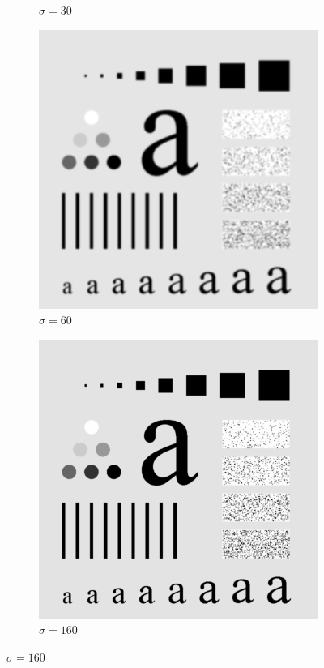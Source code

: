\documentclass[
	12pt, %
]{style/fphw}
\begin{document}
\begin{figure}[H]
\begin{subfigure}[b]{.3\textwidth}
         \caption{$\sigma=30$}
         \label{Q5_2_lowpass_30}
     \end{subfigure}
     \hfill
     \begin{subfigure}[b]{.3\textwidth}
         \centering
         \includegraphics[width=\textwidth]{plots2/Q5_2_lowpass_60.png}
         \caption{$\sigma=60$}
         \label{Q5_2_lowpass_60}
     \end{subfigure}
     \hfill
     \begin{subfigure}[b]{.3\textwidth}
         \centering
         \includegraphics[width=\textwidth]{plots2/Q5_2_lowpass_160.png}
         \caption{$\sigma=160$}
         \label{Q5_2_lowpass_160}
     \end{subfigure}
     

\end{figure}
\end{document}
